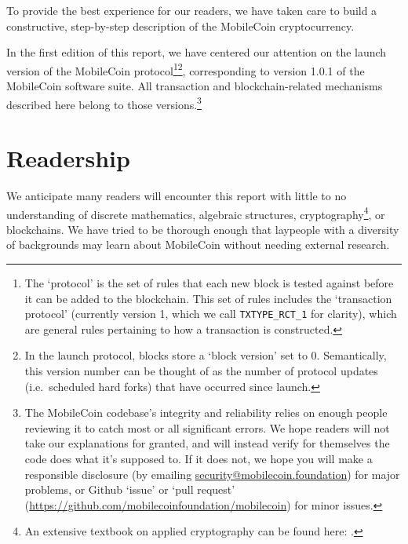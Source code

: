 To provide the best experience for our readers, we have taken care to build a constructive, step-by-step description of the MobileCoin cryptocurrency.

In the first edition of this report, we have centered our attention on the launch version of the MobileCoin protocol\footnote{The `protocol' is the set of rules that each new block is tested against before it can be added to the blockchain. This set of rules includes the `transaction protocol' (currently version 1, which we call {\tt TXTYPE\_RCT\_1} for clarity), which are general rules pertaining to how a transaction is constructed.}\footnote{In the launch protocol, blocks store a `block version' set to 0. Semantically, this version number can be thought of as the number of protocol updates (i.e.\ scheduled hard forks) that have occurred since launch.}, corresponding to version 1.0.1 of the MobileCoin software suite. All transaction and blockchain-related mechanisms described here belong to those versions.\footnote{The MobileCoin codebase's integrity and reliability relies on enough people reviewing it to catch most or all significant errors. We hope readers will not take our explanations for granted, and will instead verify for themselves the code does what it's supposed to. If it does not, we hope you will make a responsible disclosure (by emailing \url{security@mobilecoin.foundation}) for major problems, or Github `issue' or `pull request' (\url{https://github.com/mobilecoinfoundation/mobilecoin}) for minor issues.}%



\section{Readership}

We anticipate many readers will encounter this report with little to no understanding of discrete mathematics, algebraic structures, cryptography\footnote{An extensive textbook on applied cryptography can be found here: \cite{applied-cryptography-textbook}.}, or blockchains. We have tried to be thorough enough that laypeople with a diversity of backgrounds may learn about MobileCoin without needing external research.

